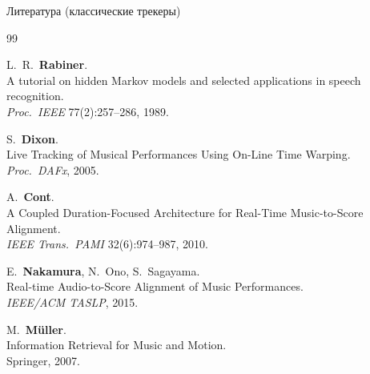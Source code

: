 \begin{frame}{Литература (классические трекеры)}

\footnotesize
\begin{thebibliography}{99}

  L.~R.~\textbf{Rabiner}.\\
  A tutorial on hidden Markov models and selected applications in
  speech recognition.\\
  \emph{Proc.\ IEEE} 77(2):257--286, 1989.

  S.~\textbf{Dixon}.\\
  Live Tracking of Musical Performances Using On-Line Time Warping.\\
  \emph{Proc.\ DAFx}, 2005.

  A.~\textbf{Cont}.\\
  A Coupled Duration-Focused Architecture for Real-Time Music-to-Score
  Alignment.\\
  \emph{IEEE Trans.\ PAMI} 32(6):974--987, 2010.

  E.~\textbf{Nakamura}, N.~Ono, S.~Sagayama.\\
  Real-time Audio-to-Score Alignment of Music Performances.\\
  \emph{IEEE/ACM TASLP}, 2015.

  M.~\textbf{Müller}.\\
  Information Retrieval for Music and Motion.\\
  Springer, 2007.

\end{thebibliography}

\end{frame}

